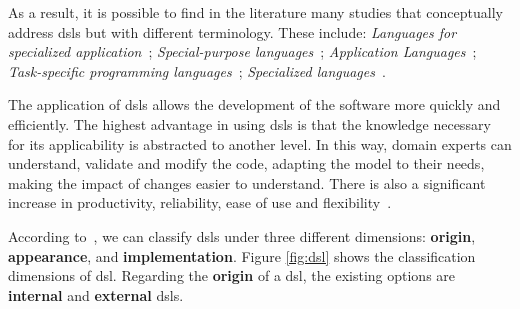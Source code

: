As a result, it is possible to find in the literature many studies that conceptually address \acp{dsl} but with different terminology.
These include: \textit{Languages for specialized application}~\cite{Sammet:1972}; \textit{Special-purpose languages}~\cite{Wexelblat:1978}; \textit{Application Languages}~\cite{Martin:1982}; \textit{Task-specific programming languages}~\cite{Nardi:1993}; \textit{Specialized languages}~\cite{Bergin:1996}.
    
The application of \acp{dsl} allows the development of the software more quickly and efficiently.
The highest advantage in using \acp{dsl} is that the knowledge necessary for its applicability is abstracted to another level.
In this way, domain experts can understand, validate and modify the code, adapting the model to their needs, making the impact of changes easier to understand.
There is also a significant increase in productivity, reliability, ease of use and flexibility~\cite{Gronback:2009, vanDeursen:2000}.

According to~\cite{Mernik:2005}, we can classify \acp{dsl} under three different dimensions: \textbf{origin}, \textbf{appearance}, and \textbf{implementation}.
Figure \ref{fig:dsl} shows the classification dimensions of \ac{dsl}.
Regarding the \textbf{origin} of a \ac{dsl}, the existing options are \textbf{internal} and \textbf{external} \acp{dsl}.

